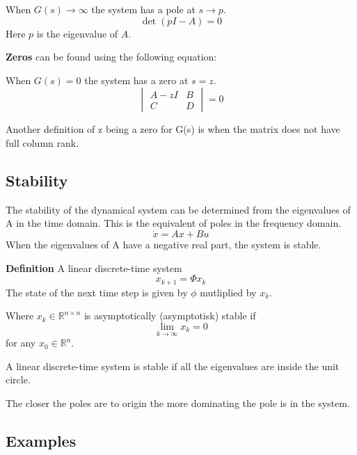 When $G(s)\to \infty$ the system has a pole at $s\to p$.
$$\det(pI-A) = 0$$
Here $p$ is the eigenvalue of $A$.

\textbf{Zeros} can be found using the following equation:

When $G(s)=0$ the system has a zero at $s=z$.
$$\begin{vmatrix}
		A-zI & B \\
		C    & D
	\end{vmatrix} = 0$$

Another definition of z being a zero for G(s) is when the matrix does not have full column rank.


\subsection{Stability}
The stability of the dynamical system can be determined from the eigenvalues of A in the time domain.
This is the equivalent of poles in the frequency domain.
$$\dot{x} = Ax+Bu$$
When the eigenvalues of A have a negative real part, the system is stable.

\textbf{Definition}
A linear discrete-time system
$$x_{k+1}=\Phi x_k$$
The state of the next time step is given by $\phi$ mutliplied by $x_k$.

Where $x_k \in \mathbb{R}^{n \times n}$ is asymptotically (asymptotisk) stable if
$$\lim_{k \to \infty} x_k = 0$$
for any $x_0 \in \mathbb{R}^n$.

A linear discrete-time system is stable if all the eigenvalues are inside the unit circle.


The closer the poles are to origin the more dominating the pole is in the system.


\subsection{Examples}
